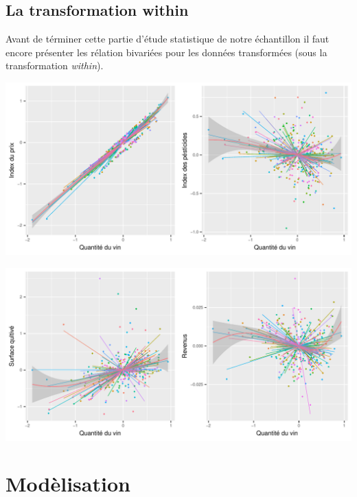 \documentclass[11pt,]{article}
\begin{document}
\FloatBarrier

\hypertarget{la-transformation-within}{%
\subsection{\texorpdfstring{La transformation
\textbf{within}}{La transformation within}}\label{la-transformation-within}}

Avant de términer cette partie d'étude statistique de notre échantillon
il faut encore présenter les rélation bivariées pour les données
transformées (sous la transformation \emph{within}).

\FloatBarrier

\includegraphics{note2pres_files/figure-latex/unnamed-chunk-30-1.pdf}

\FloatBarrier

\includegraphics{note2pres_files/figure-latex/unnamed-chunk-31-1.pdf}

\FloatBarrier

\hypertarget{modelisation}{%
\section{Modèlisation}\label{modelisation}}
\end{document}
